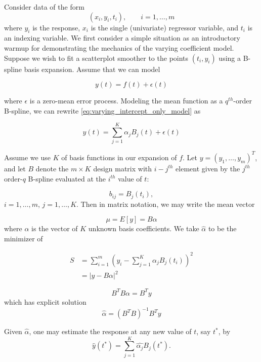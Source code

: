 \documentclass[12pt]{article}
\theoremstyle{definition}
\begin{document}
Consider data of the form 
\[
\left(x_i, y_i, t_i\right), \qquad i=1,\dots,m
\]
where $y_i$ is the response, $x_i$ is the single (univariate) regressor variable, and $t_i$ is an indexing variable. We first consider a simple situation as an introductory warmup for demonstrating the mechanics of the varying coefficient model. Suppose we wish to fit a scatterplot smoother to the points $\left(t_i, y_i\right)$ using a B-spline basis expansion. Assume that we can model 

\begin{equation} \label{eq:varying_intercept_only_model}
y\left(t\right) = f\left(t\right) + \epsilon\left(t \right)
\end{equation}

where $\epsilon$ is a zero-mean error process.  Modeling the mean function as a $q^{th}$-order B-spline, we can rewrite \ref{eq:varying_intercept_only_model} as

\begin{equation} \label{eq:varying_intercept_only_model_bspline}
y\left(t\right) = \sum_{j=1}^{K} \alpha_j B_j\left(t\right) + \epsilon\left(t \right)
\end{equation}

Assume we use $K$ of basis functions in our expansion of $f$. Let $y= \left(y_1,\dots,y_m\right)^T$, and let $B$ denote the $m \times K$ design matrix with $i-j^{th}$ element given by the $j^{th}$ order-$q$ B-spline evaluated at the $i^{th}$ value of $t$: 

\[
b_{ij} = B_j\left(t_i\right),
\]
$i=1,\dots,m$, $j=1,\dots,K$. Then in matrix notation, we may write the mean vector

\[
\mu = E\left[y\right] = B\alpha
\]
\noindent
where $\alpha$ is the vector of $K$ unknown basis coefficients. We take $\hat{\alpha}$ to be the minimizer of 

\begin{align}
S &= \sum_{i=1}^m \left(y_i - \sum_{j=1}^{K} \alpha_j B_j\left(t_i\right) \right)^2 \nonumber\\
&=\vert y - B\alpha \vert^2 \label{eq:S_varying_intercept_model}
\end{align}


\[
B^TB\alpha = B^Ty
\]
which has explicit solution
\[
\hat{\alpha} = \left(B^T B\right)^{-1}B^Ty
\]

Given $\hat{\alpha}$, one may estimate the response at any new value of $t$, say $t^*$, by 
\[
\hat{y}\left(t^*\right) = \sum_{j=1}^{K} \hat{\alpha_j}B_j\left(t^*\right).
\]
\end{document}

